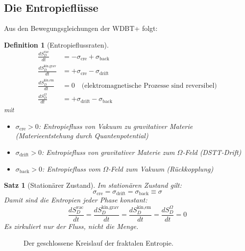 \documentclass[12pt,a4paper]{article}
\newtheorem{definition}{Definition}
\newtheorem{satz}{Satz}
\begin{document}
\subsection{Die Entropieflüsse}

Aus den Bewegungsgleichungen der WDBT+ folgt:

\begin{definition}[Entropieflussraten]
\begin{align}
\frac{dS_D^{\text{vac}}}{dt} &= -\sigma_{\text{cre}} + \sigma_{\text{back}} \\
\frac{dS_D^{\text{kin,grav}}}{dt} &= +\sigma_{\text{cre}} - \sigma_{\text{drift}} \\
\frac{dS_D^{\text{kin,em}}}{dt} &= 0 \quad \text{(elektromagnetische Prozesse sind reversibel)} \\
\frac{dS_D^{\Omega}}{dt} &= +\sigma_{\text{drift}} - \sigma_{\text{back}}
\end{align}
mit
\begin{itemize}
    \item $\sigma_{\text{cre}} > 0$: Entropiefluss von Vakuum zu gravitativer Materie (Materieentstehung durch Quantenpotential)
    \item $\sigma_{\text{drift}} > 0$: Entropiefluss von gravitativer Materie zum $\Omega$-Feld (DSTT-Drift)
    \item $\sigma_{\text{back}} > 0$: Entropiefluss vom $\Omega$-Feld zum Vakuum (Rückkopplung)
\end{itemize}
\end{definition}

\begin{satz}[Stationärer Zustand]
Im stationären Zustand gilt:
\begin{equation}
\boxed{\sigma_{\text{cre}} = \sigma_{\text{drift}} = \sigma_{\text{back}} \equiv \sigma}
\end{equation}
Damit sind die Entropien jeder Phase konstant:
\begin{equation}
\frac{dS_D^{\text{vac}}}{dt} = \frac{dS_D^{\text{kin,grav}}}{dt} = \frac{dS_D^{\text{kin,em}}}{dt} = \frac{dS_D^{\Omega}}{dt} = 0
\end{equation}
Es zirkuliert nur der Fluss, nicht die Menge.
\end{satz}

\begin{figure}[ht]
\centering
{}
\caption{Der geschlossene Kreislauf der fraktalen Entropie.}
\end{figure}
\end{document}
